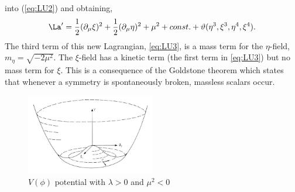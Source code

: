 into (\ref{eq:LU2}) and obtaining,
\begin{equation}
\La'=\frac{1}{2}(\partial_{\mu}\xi)^{2}+\frac{1}{2}(\partial_{\mu}\eta)^2+\mu^{2}+const.+\vartheta(\eta^{3},\xi^{3},\eta^{4},\xi^{4}).
\label{eq:LU3}
\end{equation}
The third term of this new Lagrangian, \ref{eq:LU3}, is a mass term
for the $\eta$-field, $m_{\eta}=\sqrt{-2\mu^{2}}$. The $\xi$-field has
a kinetic term (the first term in \ref{eq:LU3}) but no mass term
for $\xi$. This is a consequence of the Goldstone theorem which states
that whenever a symmetry is spontaneously broken, massless scalars occur.
\begin{figure}[hb]
  \centering
	\includegraphics[width=0.5\textwidth]{images/mexicanHat.jpg}
  	\caption[Potential]
   	{$V(\phi)$ potential with $\lambda>0$ and $\mu^{2}<0$}
	\label{fig:mexicanHat}
\end{figure}

